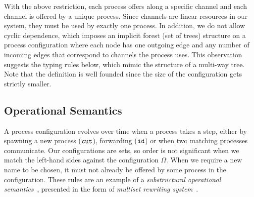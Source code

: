 \documentclass[submission,copyright,creativecommons]{eptcs}
\begin{document}
With the above restriction, each process offers along a specific channel and each channel is offered by a unique process. Since channels are linear resources in our system, they must be used by exactly one process. In addition, we do not allow cyclic dependence, which imposes an implicit forest (set of trees) structure on a process configuration where each node has one outgoing edge
and any number of incoming edges that correspond to channels the process uses. This observation suggests the typing rules below, which mimic the structure of a multi-way tree. Note that the definition is well founded since the size of the configuration gets strictly smaller.



\subsection{Operational Semantics}

A process configuration evolves over time when a process takes a step, either by spawning a new process ($\texttt{cut}$), forwarding ($\texttt{id}$) or when two matching processes communicate. Our configurations are sets, so order is not significant when we match the left-hand sides against the configuration $\Omega$.  When we require a new name to be chosen, it must not already be offered by some process in the configuration.  These rules are an example of
a \emph{substructural operational semantics}~\cite{Simmons12}, presented in the form of \emph{multiset rewriting system}~\cite{CervesatoS09}.
\end{document}
